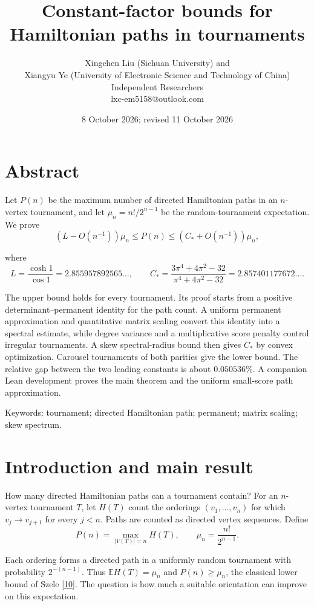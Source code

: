 \documentclass[11pt,a4paper]{article}
\title{Constant-factor bounds for Hamiltonian paths in tournaments}
\author{Xingchen Liu (Sichuan University) and\\
Xiangyu Ye (University of Electronic Science and Technology of China)\\Independent Researchers\\lxc-em5158@outlook.com}
\date{8 October 2026; revised 11 October 2026}
\makeatletter
\newcommand{\paperref}[2]{\hyperref[#1]{#2}}
\renewcommand{\maketitle}{\begin{center}{\LARGE\bfseries\@title\par}\vspace{1em}{\normalsize\@author\par}\vspace{0.5em}{\small\@date\par}\end{center}\vspace{1em}}
\makeatother
\begin{document}
\maketitle
\section*{Abstract}
\label{sec-abstract}

Let \(P(n)\) be the maximum number of directed Hamiltonian paths in an \(n\)-vertex tournament, and let \(\mu_n=n!/2^{n-1}\) be the random-tournament expectation. We prove
\[(L-O(n^{-1}))\mu_n\le P(n)\le(C_*+O(n^{-1}))\mu_n,\]

where
\[L=\frac{\cosh1}{\cos1}=2.855957892565\ldots,
\qquad
C_*=\frac{3\pi^4+4\pi^2-32}{\pi^4+4\pi^2-32}
=2.857401177672\ldots.\]

The upper bound holds for every tournament. Its proof starts from a positive determinant--permanent identity for the path count. A uniform permanent approximation and quantitative matrix scaling convert this identity into a spectral estimate, while degree variance and a multiplicative score penalty control irregular tournaments. A skew spectral-radius bound then gives \(C_*\) by convex optimization. Carousel tournaments of both parities give the lower bound. The relative gap between the two leading constants is about \(0.050536\%\). A companion Lean development proves the main theorem and the uniform small-score path approximation.

Keywords: tournament; directed Hamiltonian path; permanent; matrix scaling; skew spectrum.

\section{Introduction and main result}\label{sec-1}

How many directed Hamiltonian paths can a tournament contain? For an \(n\)-vertex tournament \(T\), let \(H(T)\) count the orderings \((v_1,\ldots,v_n)\) for which \(v_j\to v_{j+1}\) for every \(j<n\). Paths are counted as directed vertex sequences. Define
\[P(n)=\max_{|V(T)|=n}H(T),\qquad \mu_n=\frac{n!}{2^{n-1}}.\]

Each ordering forms a directed path in a uniformly random tournament with probability \(2^{-(n-1)}\). Thus \(\mathbb E H(T)=\mu_n\) and \(P(n)\ge\mu_n\), the classical lower bound of Szele \paperref{bib-10}{[10]}. The question is how much a suitable orientation can improve on this expectation.
\end{document}
